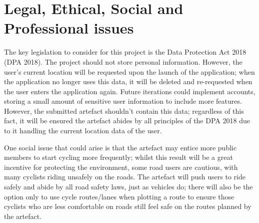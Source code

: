 \clearpage
\section{Legal, Ethical, Social and Professional issues}
\label{intro:legal...issues}

The key legislation to consider for this project is the Data Protection Act 2018 (DPA 2018). The project should not store personal information. However, the user’s current location will be requested upon the launch of the application; when the application no longer uses this data, it will be deleted and re-requested when the user enters the application again. Future iterations could implement accounts, storing a small amount of sensitive user information to include more features. However, the submitted artefact shouldn’t contain this data; regardless of this fact, it will be ensured the artefact abides by all principles of the DPA 2018 due to it handling the current location data of the user.

One social issue that could arise is that the artefact may entice more public members to start cycling more frequently; whilst this result will be a great incentive for protecting the environment, some road users are cautious, with many cyclists riding unsafely on the roads. The artefact will push users to ride safely and abide by all road safety laws, just as vehicles do; there will also be the option only to use cycle routes/lanes when plotting a route to ensure those cyclists who are less comfortable on roads still feel safe on the routes planned by the artefact.